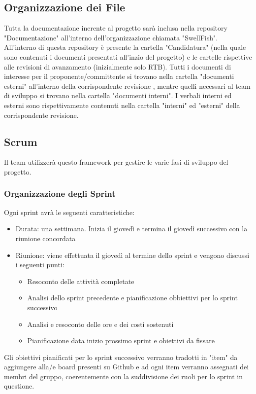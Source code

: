 \documentclass[12pt]{article}
\begin{document}
\subsection{Organizzazione dei File}
Tutta la documentazione inerente al progetto sarà inclusa nella repository "Documentazione" all'interno dell'organizzazione chiamata "SwellFish".\\
All'interno di questa repository è presente la cartella "Candidatura" (nella quale sono contenuti i documenti presentati all'inzio del progetto) e le cartelle rispettive alle revisioni di avanzamento (inizialmente solo RTB). 
Tutti i documenti di interesse per il proponente/committente si trovano nella cartella "documenti esterni" all'interno della corrispondente revisione , mentre quelli necessari al team di sviluppo si trovano nella cartella "documenti interni".
I verbali interni ed esterni sono rispettivamente contenuti nella cartella "interni" ed "esterni" della corrispondente revisione.

\subsection{Scrum}
Il team utilizzerà questo framework per gestire le varie fasi di sviluppo del progetto.
\label{Sprint}
\subsubsection{Organizzazione degli Sprint}
Ogni sprint avrà le seguenti caratteristiche:
\begin{itemize}
    \item Durata: una settimana. Inizia il giovedì e termina il giovedì successivo con la riunione concordata
    \item Riunione: viene effettuata il giovedì al termine dello sprint e vengono discussi i seguenti punti:
          \begin{itemize}
              \item Resoconto delle attività completate
              \item Analisi dello sprint precedente e pianificazione obbiettivi per lo sprint successivo
              \item Analisi e resoconto delle ore e dei costi sostenuti
              \item Pianificazione data inizio prossimo sprint e obiettivi da fissare
          \end{itemize}
\end{itemize}
Gli obiettivi pianificati per lo sprint successivo verranno tradotti in "item" da aggiungere alla/e board presenti su Github e ad ogni item verranno assegnati dei membri del gruppo, coerentemente con la suddivisione dei ruoli per lo sprint in questione.
\end{document}
